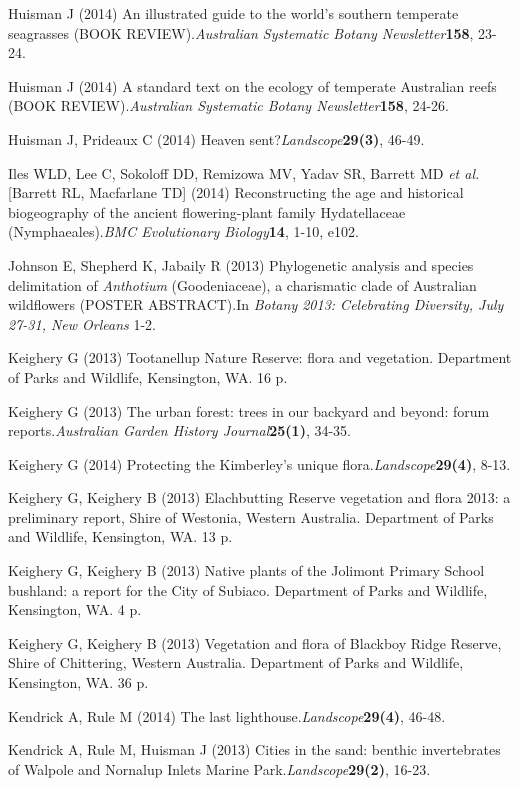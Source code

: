 \documentclass[version=last, paper=a4, DIV=18, usenames, dvipsnames]{scrartcl}
\begin{document}
Huisman J (2014) An illustrated guide to the world's southern temperate seagrasses (BOOK REVIEW).\emph{Australian Systematic Botany Newsletter}\textbf{158}, 23-24.


Huisman J (2014) A standard text on the ecology of temperate Australian reefs (BOOK REVIEW).\emph{Australian Systematic Botany Newsletter}\textbf{158}, 24-26.


Huisman J, Prideaux C (2014) Heaven sent?\emph{Landscope}\textbf{29(3)}, 46-49.


Iles WLD, Lee C, Sokoloff DD, Remizowa MV, Yadav SR, Barrett MD \emph{et al.} [Barrett RL, Macfarlane TD] (2014) Reconstructing the age and historical biogeography of the ancient flowering-plant family Hydatellaceae (Nymphaeales).\emph{BMC Evolutionary Biology}\textbf{14}, 1-10, e102.


Johnson E, Shepherd K, Jabaily R (2013) Phylogenetic analysis and species delimitation of \emph{Anthotium} (Goodeniaceae), a charismatic clade of Australian wildflowers (POSTER ABSTRACT).In \emph{Botany 2013: Celebrating Diversity, July 27-31, New Orleans} 1-2.


Keighery G (2013) Tootanellup Nature Reserve: flora and vegetation. Department of Parks and Wildlife, Kensington, WA. 16 p.


Keighery G (2013) The urban forest: trees in our backyard and beyond: forum reports.\emph{Australian Garden History Journal}\textbf{25(1)}, 34-35.


Keighery G (2014) Protecting the Kimberley's unique flora.\emph{Landscope}\textbf{29(4)}, 8-13.


Keighery G, Keighery B (2013) Elachbutting Reserve vegetation and flora 2013: a preliminary report, Shire of Westonia, Western Australia. Department of Parks and Wildlife, Kensington, WA. 13 p.


Keighery G, Keighery B (2013) Native plants of the Jolimont Primary School bushland: a report for the City of Subiaco. Department of Parks and Wildlife, Kensington, WA. 4 p.


Keighery G, Keighery B (2013) Vegetation and flora of Blackboy Ridge Reserve, Shire of Chittering, Western Australia. Department of Parks and Wildlife, Kensington, WA. 36 p.


Kendrick A, Rule M (2014) The last lighthouse.\emph{Landscope}\textbf{29(4)}, 46-48.


Kendrick A, Rule M, Huisman J (2013) Cities in the sand: benthic invertebrates of Walpole and Nornalup Inlets Marine Park.\emph{Landscope}\textbf{29(2)}, 16-23.
\end{document}
